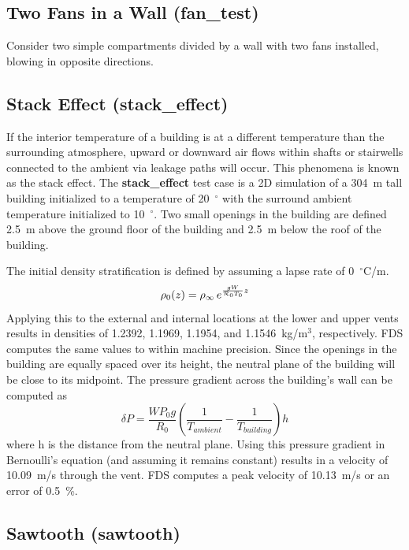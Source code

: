 \documentclass[11pt]{book}
\newcommand{\be}{\begin{equation}}
\newcommand{\ee}{\end{equation}}
\begin{document}
\clearpage


\subsection{Two Fans in a Wall ({\bf fan\_test})  }
\label{fan_test}

Consider two simple compartments divided by a wall with two fans installed, blowing in opposite directions.



\clearpage

\subsection{Stack Effect ({\bf stack\_effect})  }
\label{stack_effect}

If the interior temperature of a building is at a different temperature than the surrounding atmosphere, upward or
downward air flows within shafts or stairwells connected to the ambient via leakage paths will occur.  This
phenomena is known as the stack effect.  The {\bf stack\_effect} test case is a 2D simulation of a 304~m tall building
initialized to a temperature of 20~$^\circ$ with the surround ambient temperature initialized to 10~$^\circ$.
Two small openings in the building are defined 2.5~m above the ground floor of the building and 2.5~m below the
roof of the building.

The initial density stratification is defined by assuming a lapse rate of 0~$^\circ$C/m.
\be
   \rho_0(z) = \rho_\infty \, e^{ \frac{g W}{{\cal R}_0 T_0} z}
\ee
Applying this to the external and internal locations at the lower and upper vents results in densities of 1.2392,
1.1969, 1.1954, and 1.1546~kg/m$^3$, respectively.  FDS computes the same values to within machine precision.  Since the
openings in the building are equally spaced over its height, the neutral plane of the building will be close to its midpoint.
The pressure gradient across the building's wall can be computed as
\be
   \delta P = \frac{W P_0 g} {R_{0}} \left( \frac {1}{T_{ambient}} - \frac {1}{T_{building}} \right) h
\ee
where h is the distance from the neutral plane.  Using this pressure gradient in Bernoulli's equation (and assuming it remains constant)
results in a velocity of 10.09~m/s through the vent.  FDS computes a peak velocity of 10.13~m/s or an error of 0.5~\%.

\clearpage



\subsection{Sawtooth ({\bf sawtooth})  }
\label{sawtooth}
\end{document}
